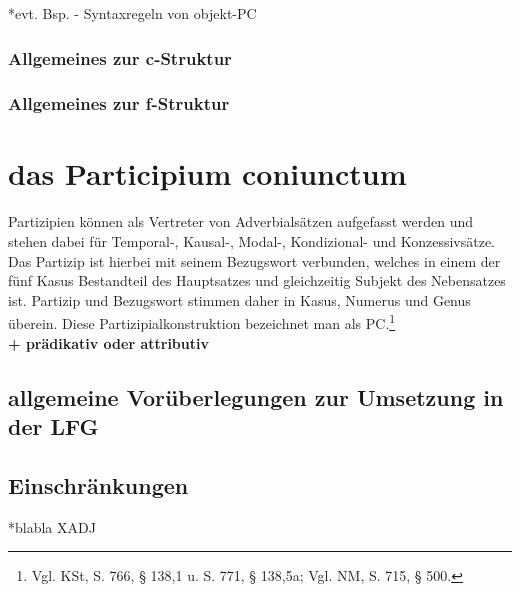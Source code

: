 \documentclass[12pt,a4paper]{article}
\begin{document}






*evt. Bsp. - Syntaxregeln von objekt-PC

\subsubsection{Allgemeines zur c-Struktur}
\subsubsection{Allgemeines zur f-Struktur}

\section{das Participium coniunctum}
Partizipien können als Vertreter von Adverbialsätzen aufgefasst werden und stehen dabei für Temporal-, Kausal-, Modal-, Kondizional- und Konzessivsätze. Das Partizip ist hierbei mit seinem Bezugswort verbunden, welches in einem der fünf Kasus Bestandteil des Hauptsatzes und gleichzeitig Subjekt des Nebensatzes ist. Partizip und Bezugswort stimmen daher in Kasus, Numerus und Genus überein. Diese Partizipialkonstruktion bezeichnet man als PC.\footnote{Vgl. KSt, S. 766, § 138,1 u. S. 771, § 138,5a; Vgl. NM, S. 715, § 500.} \\
\textbf{+ prädikativ oder attributiv} \\

\subsection{allgemeine Vorüberlegungen zur Umsetzung in der LFG}
\subsection{Einschränkungen}
*blabla XADJ \\
\end{document}
